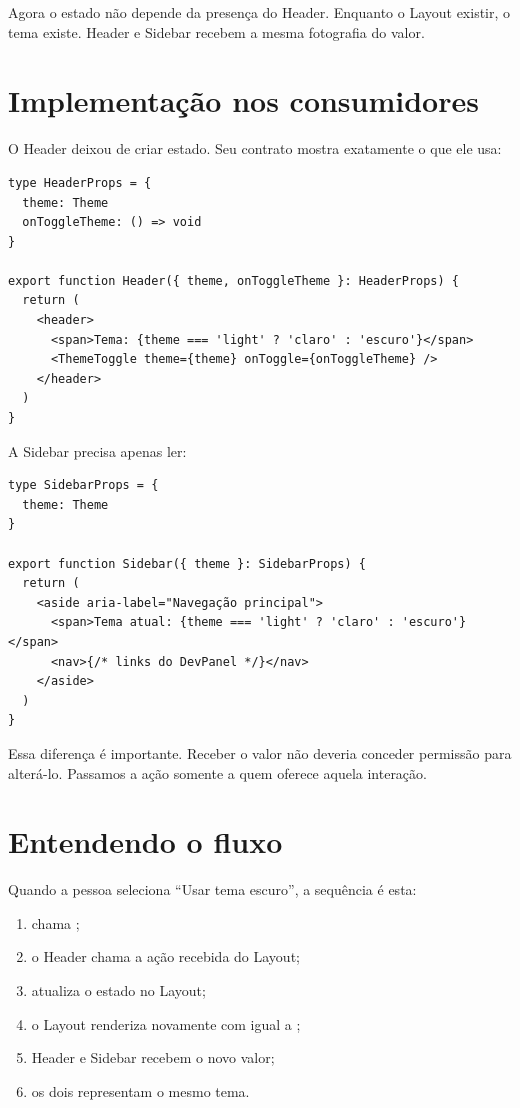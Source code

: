 Agora o estado não depende da presença do Header. Enquanto o Layout existir, o
tema existe. Header e Sidebar recebem a mesma fotografia do valor.

\section{Implementação nos consumidores}

O Header deixou de criar estado. Seu contrato mostra exatamente o que ele usa:

\begin{lstlisting}[caption={O Header recebe valor e ação.}]
type HeaderProps = {
  theme: Theme
  onToggleTheme: () => void
}

export function Header({ theme, onToggleTheme }: HeaderProps) {
  return (
    <header>
      <span>Tema: {theme === 'light' ? 'claro' : 'escuro'}</span>
      <ThemeToggle theme={theme} onToggle={onToggleTheme} />
    </header>
  )
}
\end{lstlisting}

A Sidebar precisa apenas ler:

\begin{lstlisting}[caption={A Sidebar não recebe uma ação que não utiliza.}]
type SidebarProps = {
  theme: Theme
}

export function Sidebar({ theme }: SidebarProps) {
  return (
    <aside aria-label="Navegação principal">
      <span>Tema atual: {theme === 'light' ? 'claro' : 'escuro'}</span>
      <nav>{/* links do DevPanel */}</nav>
    </aside>
  )
}
\end{lstlisting}

Essa diferença é importante. Receber o valor não deveria conceder permissão para
alterá-lo. Passamos a ação somente a quem oferece aquela interação.

\section{Entendendo o fluxo}

Quando a pessoa seleciona ``Usar tema escuro'', a sequência é esta:

\begin{enumerate}
  \item {} chama ;
  \item o Header chama a ação recebida do Layout;
  \item {} atualiza o estado no Layout;
  \item o Layout renderiza novamente com  igual a
    ;
  \item Header e Sidebar recebem o novo valor;
  \item os dois representam o mesmo tema.
\end{enumerate}

